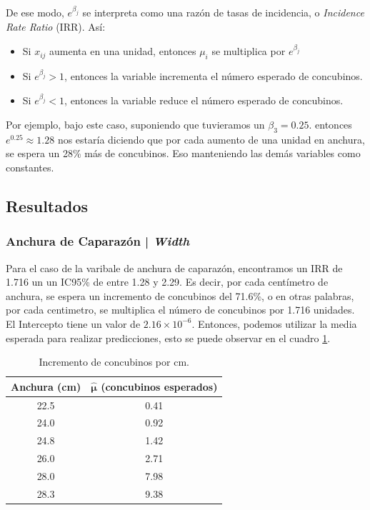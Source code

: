 De ese modo, $e^{\beta_j}$ se interpreta como una razón de tasas de incidencia, o \textit{Incidence Rate Ratio} (IRR). Así:

\begin{itemize}
    \item Si $x_{ij}$ aumenta en una unidad, entonces $\mu_i$ se multiplica por $e^{\beta_j}$
    \item Si $e^{\beta_j} > 1$, entonces la variable incrementa el número esperado de concubinos.
    \item Si $e^{\beta_j} < 1$, entonces la variable reduce el número esperado de concubinos.
\end{itemize}

Por ejemplo, bajo este caso, suponiendo que tuvieramos un $\beta_3 = 0.25$. entonces $e^{0.25} \approx 1.28$
nos estaría diciendo que por cada aumento de una unidad en anchura, se espera un 28\% más de concubinos. Eso 
manteniendo las demás variables como constantes.


\subsection{Resultados}

\subsubsection{Anchura de Caparazón | \textit{Width}}

Para el caso de la varibale de anchura de caparazón, encontramos un IRR de 1.716 un un IC95\% de entre 1.28 y 2.29.
Es decir, por cada centímetro de anchura, se espera un incremento de concubinos del 71.6\%, o en otras
palabras, por cada centimetro, se multiplica el número de concubinos por 1.716 unidades. El Intercepto
tiene un valor de $2.16 \times 10^{-6}$. Entonces, podemos utilizar la media esperada para realizar predicciones,
esto se puede observar en el cuadro \ref{tab:width-capa}.\\

\begin{table}[h!]
    \centering
    \begin{tabular}{|c|c|}
        \hline
        \textbf{Anchura (cm)} & $\boldsymbol{\hat{\mu}}$ \textbf{(concubinos esperados)} \\
        \hline
        22.5 & 0.41 \\
        \hline
        24.0 & 0.92 \\
        \hline
        24.8 & 1.42 \\
        \hline
        26.0 & 2.71 \\
        \hline
        28.0 & 7.98 \\
        \hline
        28.3 & 9.38 \\
        \hline
    \end{tabular}
    \caption{Incremento de concubinos por cm.}
    \label{tab:width-capa}
\end{table}


